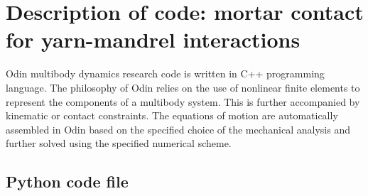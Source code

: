 \section{Description of code: mortar contact for yarn-mandrel interactions}
Odin multibody dynamics research code \cite{odin2022} is written in C++ programming language. The philosophy of Odin relies on the use of nonlinear finite elements to represent the components of a multibody system. This is further accompanied by kinematic or contact constraints. The equations of motion are automatically assembled in Odin based on the specified choice of the mechanical analysis and further solved using the specified numerical scheme.\\

\subsection{Python code file} 
